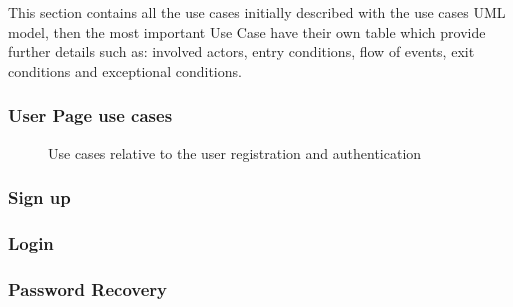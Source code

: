 This section contains all the use cases initially described with the use cases UML model, then the most important Use Case have their own table which provide further details such as: involved actors, entry conditions, flow of events,  exit conditions and exceptional conditions.

\subsubsection{User Page use cases}
\begin{figure}[htp] 
\caption{Use cases relative to the user registration and authentication} 
\label{fig:userpage} 
\end{figure} 

\newpage
\subsubsection{Sign up}

\newpage
\subsubsection{Login}

\newpage
\subsubsection{Password Recovery}

\newpage



